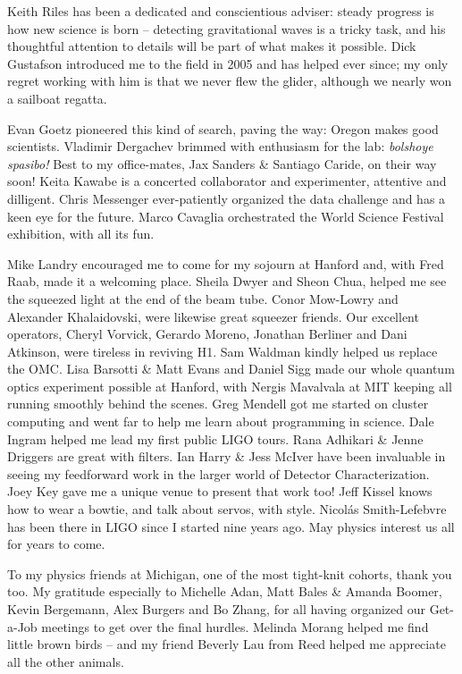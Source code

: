 \documentclass[leqno,twoside]{report}
\theoremstyle{plain}
\theoremstyle{definition}
\theoremstyle{remark}
\numberwithin{theorem}{chapter}        %
\begin{document}
Keith Riles has been a dedicated and conscientious adviser: steady progress is how new science is born -- detecting gravitational waves is a tricky task, and his thoughtful attention to details will be part of what makes it possible.
Dick Gustafson introduced me to the field in 2005 and has helped ever since; my only regret working with him is that we never flew the glider, although we nearly won a sailboat regatta.

Evan Goetz pioneered this kind of search, paving the way: Oregon makes good scientists.
Vladimir Dergachev brimmed with enthusiasm for the lab: \textit{bolshoye spasibo!}
Best to my office-mates, Jax Sanders \& Santiago Caride, on their way soon!
Keita Kawabe is a concerted collaborator and experimenter, attentive and dilligent.
Chris Messenger ever-patiently organized the data challenge and has a keen eye for the future.
Marco Cavaglia orchestrated the World Science Festival exhibition, with all its fun.

Mike Landry encouraged me to come for my sojourn at Hanford and, with Fred Raab, made it a welcoming place.
Sheila Dwyer and Sheon Chua, helped me see the squeezed light at the end of the beam tube.
Conor Mow-Lowry and Alexander Khalaidovski, were likewise great squeezer friends. 
Our excellent operators, Cheryl Vorvick, Gerardo Moreno, Jonathan Berliner and Dani Atkinson, were tireless in reviving H1.
Sam Waldman kindly helped us replace the OMC.
Lisa Barsotti \& Matt Evans and Daniel Sigg made our whole quantum optics experiment possible at Hanford, with Nergis Mavalvala at MIT keeping all running smoothly behind the scenes.
Greg Mendell got me started on cluster computing and went far to help me learn about programming in science.
Dale Ingram helped me lead my first public LIGO tours.
Rana Adhikari \& Jenne Driggers are great with filters.
Ian Harry \& Jess McIver have been invaluable in seeing my feedforward work in the larger world of Detector Characterization.
Joey Key gave me a unique venue to present that work too!
Jeff Kissel knows how to wear a bowtie, and talk about servos, with style.
Nicol\'{a}s Smith-Lefebvre has been there in LIGO since I started nine years ago.
May physics interest us all for years to come.

To my physics friends at Michigan, one of the most tight-knit cohorts, thank you too.
My gratitude especially to Michelle Adan, Matt Bales \& Amanda Boomer, Kevin Bergemann, Alex Burgers and Bo Zhang, for all having organized our Get-a-Job meetings to get over the final hurdles.
Melinda Morang helped me find little brown birds -- and my friend Beverly Lau from Reed helped me appreciate all the other animals.
\end{document}
